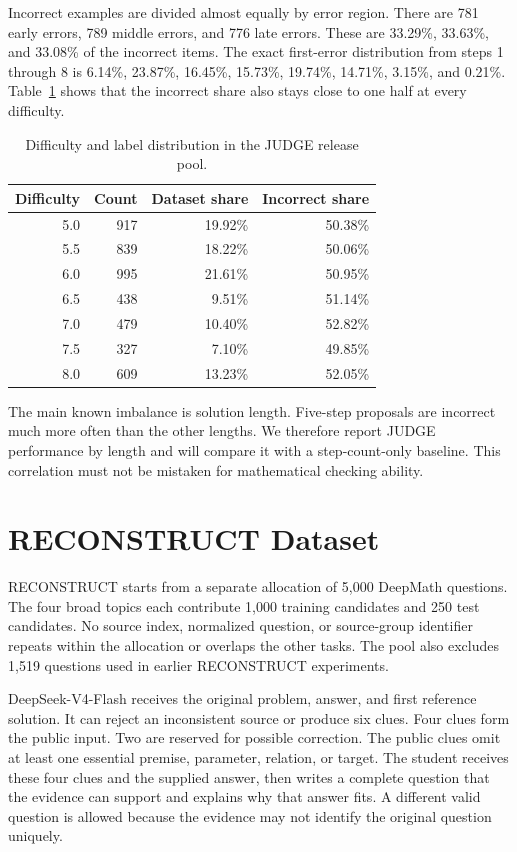 \documentclass[11pt]{article}
\begin{document}
Incorrect examples are divided almost equally by error region. There are 781 early errors, 789 middle errors, and 776 late errors. These are 33.29\%, 33.63\%, and 33.08\% of the incorrect items. The exact first-error distribution from steps 1 through 8 is 6.14\%, 23.87\%, 16.45\%, 15.73\%, 19.74\%, 14.71\%, 3.15\%, and 0.21\%. Table~\ref{tab:judge-difficulty} shows that the incorrect share also stays close to one half at every difficulty.

\begin{table}[t]
\centering
\small
\setlength{\tabcolsep}{4pt}
\begin{tabular}{rrrr}
\toprule
Difficulty & Count & Dataset share & Incorrect share \\
\midrule
5.0 & 917 & 19.92\% & 50.38\% \\
5.5 & 839 & 18.22\% & 50.06\% \\
6.0 & 995 & 21.61\% & 50.95\% \\
6.5 & 438 & 9.51\% & 51.14\% \\
7.0 & 479 & 10.40\% & 52.82\% \\
7.5 & 327 & 7.10\% & 49.85\% \\
8.0 & 609 & 13.23\% & 52.05\% \\
\bottomrule
\end{tabular}
\caption{Difficulty and label distribution in the JUDGE release pool.}
\label{tab:judge-difficulty}
\end{table}

The main known imbalance is solution length. Five-step proposals are incorrect much more often than the other lengths. We therefore report JUDGE performance by length and will compare it with a step-count-only baseline. This correlation must not be mistaken for mathematical checking ability.

\section{RECONSTRUCT Dataset}

RECONSTRUCT starts from a separate allocation of 5,000 DeepMath questions. The four broad topics each contribute 1,000 training candidates and 250 test candidates. No source index, normalized question, or source-group identifier repeats within the allocation or overlaps the other tasks. The pool also excludes 1,519 questions used in earlier RECONSTRUCT experiments.

DeepSeek-V4-Flash receives the original problem, answer, and first reference solution. It can reject an inconsistent source or produce six clues. Four clues form the public input. Two are reserved for possible correction. The public clues omit at least one essential premise, parameter, relation, or target. The student receives these four clues and the supplied answer, then writes a complete question that the evidence can support and explains why that answer fits. A different valid question is allowed because the evidence may not identify the original question uniquely.
\end{document}
